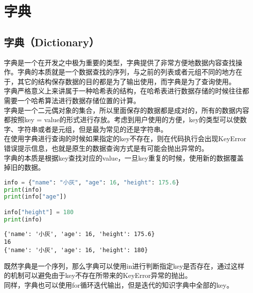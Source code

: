 \section{字典}

\subsection{字典（Dictionary）}

字典是一个在开发之中极为重要的类型，字典提供了非常方便地数据内容查找操作。字典的本质就是一个数据查找的序列，与之前的列表或者元组不同的地方在于，其它的结构保存数据的目的都是为了输出使用，而字典是为了查询使用。\\

字典严格意义上来讲属于一种哈希表的结构，在哈希表进行数据存储的时候往往都需要一个哈希算法进行数据存储位置的计算。\\

字典是一个二元偶对象的集合，所以里面保存的数据都是成对的，所有的数据内容都按照key = value的形式进行存放。考虑到用户使用的方便，key的类型可以使数字、字符串或者是元组，但是最为常见的还是字符串。\\

在使用字典进行查询的时候如果指定的key不存在，则在代码执行会出现KeyError错误提示信息，也就是原生的数据查询方式是有可能会抛出异常的。\\

字典的本质是根据key查找对应的value，一旦key重复的时候，使用新的数据覆盖掉旧的数据。\\


\begin{lstlisting}[language=Python]
info = {"name": "小灰", "age": 16, "height": 175.6}
print(info)
print(info["age"])

info["height"] = 180
print(info)
\end{lstlisting}

\begin{tcolorbox}
	\begin{verbatim}
{'name': '小灰', 'age': 16, 'height': 175.6}
16
{'name': '小灰', 'age': 16, 'height': 180}
\end{verbatim}
\end{tcolorbox}

既然字典是一个序列，那么字典可以使用in进行判断指定key是否存在，通过这样的机制可以避免由于key不存在所带来的KeyError异常的抛出。\\


同样，字典也可以使用for循环迭代输出，但是迭代的知识字典中全部的key。\\

